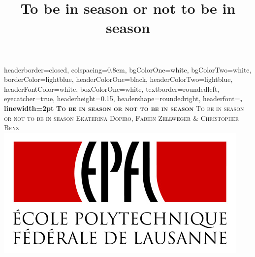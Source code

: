 \documentclass[landscape,a0paper,fontscale=0.285]{baposter} %
\title{To be in season or not to be in season}
\begin{document}
\begin{poster}
{
headerborder=closed, %
colspacing=0.8em, %
bgColorOne=white, %
bgColorTwo=white, %
borderColor=lightblue, %
headerColorOne=black, %
headerColorTwo=lightblue, %
headerFontColor=white, %
boxColorOne=white, %
textborder=roundedleft, %
eyecatcher=true, %
headerheight=0.15\textheight, %
headershape=roundedright, %
headerfont=\Large\bf\textsc, %
linewidth=2pt %
}
{\bf\textsc{To be in season or not to be in season}\vspace{0.5em}} %
{\textsc{ To be in season or not to be in season \hspace{20pt}}}
{\textsc{ Ekaterina Dopiro, Fabien Zellweger \& Christopher Benz \\ \includegraphics[scale=0.3\textwidth,natwidth=472,natheight=244]{img/EPFL-Logo-RVB-55.jpg} \hspace{6pt}}} 


\end{poster}
\end{document}
